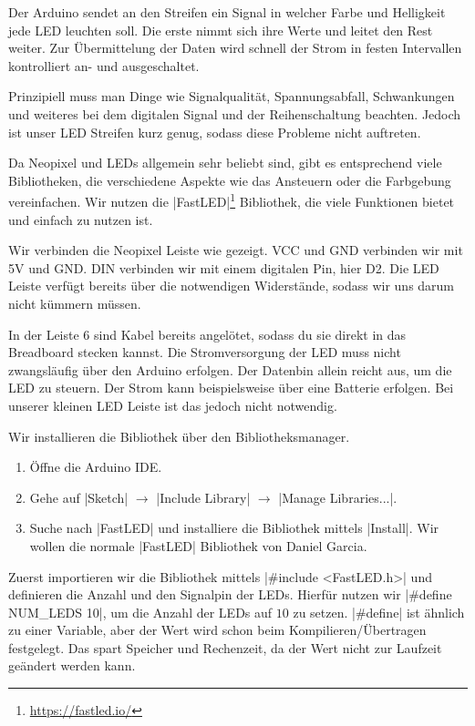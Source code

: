 \documentclass[a4paper,12pt]{book}
\begin{document}
Der Arduino sendet an den Streifen ein Signal in welcher Farbe und Helligkeit jede LED leuchten soll. 
Die erste nimmt sich ihre Werte und leitet den Rest weiter.
Zur Übermittelung der Daten wird schnell der Strom in festen Intervallen kontrolliert an- und ausgeschaltet.

Prinzipiell muss man Dinge wie Signalqualität, Spannungsabfall, Schwankungen und weiteres bei dem digitalen Signal und der Reihenschaltung beachten.
Jedoch ist unser LED Streifen kurz genug, sodass diese Probleme nicht auftreten.

Da Neopixel und LEDs allgemein sehr beliebt sind, gibt es entsprechend viele Bibliotheken, die verschiedene Aspekte wie das 
Ansteuern oder die Farbgebung vereinfachen.
Wir nutzen die |FastLED|\footnote{\url{https://fastled.io/}} Bibliothek, die viele Funktionen bietet und einfach zu nutzen ist.


Wir verbinden die Neopixel Leiste wie gezeigt. VCC und GND verbinden wir mit 5V und GND.
DIN verbinden wir mit einem digitalen Pin, hier D2.
Die LED Leiste verfügt bereits über die notwendigen Widerstände, sodass wir uns darum nicht kümmern müssen.

In der Leiste 6 sind Kabel bereits angelötet, sodass du sie direkt in das Breadboard stecken kannst.
Die Stromversorgung der LED muss nicht zwangsläufig über den Arduino erfolgen.
Der Datenbin allein reicht aus, um die LED zu steuern. Der Strom kann beispielsweise über eine Batterie erfolgen.
Bei unserer kleinen LED Leiste ist das jedoch nicht notwendig.

Wir installieren die Bibliothek über den Bibliotheksmanager.
\begin{enumerate}
  \item Öffne die Arduino IDE.
  \item Gehe auf |Sketch| $\rightarrow$ |Include Library| $\rightarrow$ |Manage Libraries...|.
  \item Suche nach |FastLED| und installiere die Bibliothek mittels |Install|.
  Wir wollen die normale |FastLED| Bibliothek von Daniel Garcia.
\end{enumerate}



Zuerst importieren wir die Bibliothek mittels |#include <FastLED.h>|
und definieren die Anzahl und den Signalpin der LEDs.
Hierfür nutzen wir |#define NUM_LEDS 10|, um die Anzahl der LEDs auf $10$ zu setzen.
|#define| ist ähnlich zu einer Variable, aber der Wert wird schon beim Kompilieren/Übertragen festgelegt.
Das spart Speicher und Rechenzeit, da der Wert nicht zur Laufzeit geändert werden kann.
\end{document}
